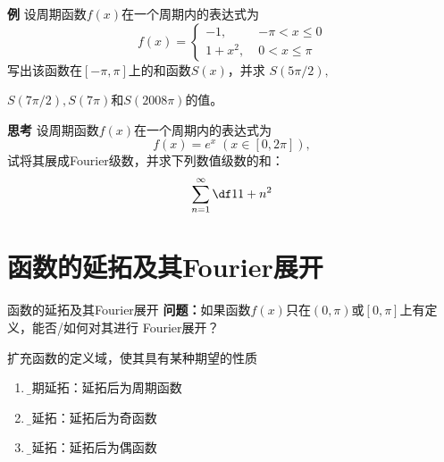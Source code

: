 \begin{frame}
	\linespread{1.5}
	\begin{exampleblock}{{\bf 例}\hfill}
		设周期函数$f(x)$在一个周期内的表达式为
		$$f(x)=\left\{\begin{array}{ll}
			-1,\;& -\pi<x\leq 0\\
			1+x^2,\; & 0<x\leq\pi
		\end{array}\right.$$
		写出该函数在$[-\pi,\pi]$上的和函数$S(x)$，并求
		$S(5\pi/2),$
		
		$S(7\pi/2),S(7\pi)$和$S(2008\pi)$的值。
	\end{exampleblock}
\end{frame}

% 

\begin{frame}
	\linespread{1.5}
	\begin{exampleblock}{{\bf 思考}\hfill}
		设周期函数$f(x)$在一个周期内的表达式为
		$$f(x)=e^x\;(x\in[0,2\pi]),$$
		试将其展成Fourier级数，并求下列数值级数的和：
		$$\sum\limits_{n=1}^{\infty}\df1{1+n^2}$$
	\end{exampleblock}
\end{frame}

\section{函数的延拓及其Fourier展开}

\begin{frame}{函数的延拓及其Fourier展开}
	\linespread{1.3}\pause 
	{{\bf 问题：}如果函数$f(x)$只在$(0,\pi)$或$[0,\pi]$上有定义，能否/如何对其进行
	Fourier展开？}\pause 
	
	\bigskip
	\pause 扩充函数的定义域，使其具有某种期望的性质\pause 
	\begin{enumerate}
	  \item {\b 周期延拓：}\pause 延拓后为周期函数\pause 
	  \item {\b 奇延拓：}\pause 延拓后为奇函数\pause 
	  \item {\b 偶延拓：}\pause 延拓后为偶函数
	\end{enumerate}	
\end{frame}

